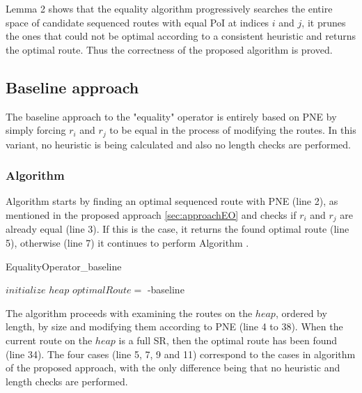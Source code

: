 Lemma 2 shows that the equality algorithm progressively searches the entire space of candidate sequenced routes with equal PoI at indices $i$ and $j$, it prunes the ones that could not be optimal according to a consistent heuristic and returns the optimal route. Thus the correctness of the proposed algorithm is proved.

\subsection{Baseline approach} 
\label{sec:baselineEO}
\enlargethispage{\baselineskip}
The baseline approach to the "equality" operator is entirely based on PNE by simply forcing $r_i$ and $r_j$ to be equal in the process of modifying the routes. In this variant, no heuristic is being calculated and also no length checks are performed.

\subsubsection{Algorithm}
Algorithm \texttt{} starts by finding an optimal sequenced route with PNE (line 2), as mentioned in the proposed approach \ref{sec:approachEO} and checks if $r_i$ and $r_j$ are already equal (line 3). If this is the case, it returns the found optimal route (line 5), otherwise (line 7) it continues to perform Algorithm \texttt{}. 

\begin{algorithm}[htb!]
\caption{EqualityOperator\_baseline}
\label{alg:equality_baseline}
	
	
	
	\BlankLine
	
	$initialize$ $heap$ 
	$optimalRoute =$\;
	{
		\modifiedPNE-baseline{}\;
	}
\end{algorithm}

The algorithm \texttt{} proceeds with examining the routes on the $heap$, ordered by length, by size and modifying them according to PNE (line 4 to 38). When the current route on the $heap$ is a full SR, then the optimal route has been found (line 34). The four cases (line 5, 7, 9 and 11) correspond to the cases in algorithm of the proposed approach, with the only difference being that no heuristic and length checks are performed. \newline

